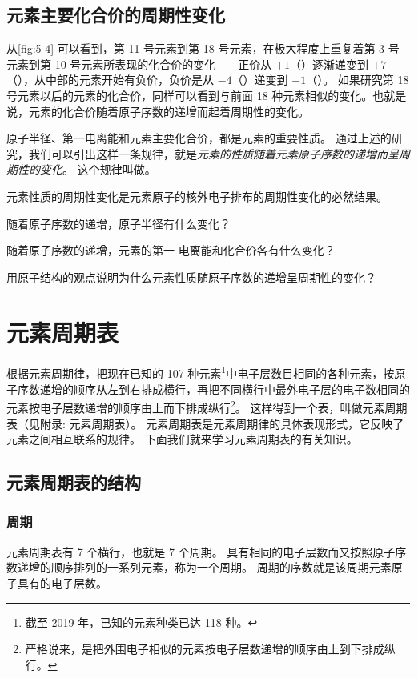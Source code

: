 \subsection{元素主要化合价的周期性变化}
从\cref{fig:5-4} 可以看到，第 11 号元素到第 18 号元素，在极大程度上重复着第 3 号元素到第 10 号元素所表现的化合价的变化——正价从 $+1$（）逐渐递变到 $+7$（），从中部的元素开始有负价，负价是从 $-4$（）递变到 $-1$（）。
如果研究第 18 号元素以后的元素的化合价，同样可以看到与前面 18 种元素相似的变化。也就是说，元素的化合价随着原子序数的递增而起着周期性的变化。

原子半径、第一电离能和元素主要化合价，都是元素的重要性质。
通过上述的研究，我们可以引出这样一条规律，就是\emph{元素的性质随着元素原子序数的递增而呈周期性的变化}。 
这个规律叫做。

元素性质的周期性变化是元素原子的核外电子排布的周期性变化的必然结果。

\begin{Practice}[习题]
  \begin{question}
    \item 随着原子序数的递增，原子半径有什么变化？
    \item 随着原子序数的递增，元素的第一 电离能和化合价各有什么变化？
    \item 用原子结构的观点说明为什么元素性质随原子序数的递增呈周期性的变化？
  \end{question}
\end{Practice}
\section{元素周期表}
根据元素周期律，把现在已知的 107 种元素\footnote{截至 2019 年，已知的元素种类已达 118 种。}中电子层数目相同的各种元素，按原子序数递增的顺序从左到右排成横行，再把不同横行中最外电子层的电子数相同的元素按电子层数递增的顺序由上而下排成纵行\footnote{严格说来，是把外围电子相似的元素按电子层数递增的顺序由上到下排成纵行。}。
这样得到一个表，叫做元素周期表（见附录: 元素周期表）。
元素周期表是元素周期律的具体表现形式，它反映了元素之间相互联系的规律。
下面我们就来学习元素周期表的有关知识。

\subsection{元素周期表的结构}
\subsubsection{周期}
元素周期表有 7 个横行，也就是 7 个周期。
具有相同的电子层数而又按照原子序数递增的顺序排列的一系列元素，称为一个周期。
周期的序数就是该周期元素原子具有的电子层数。

